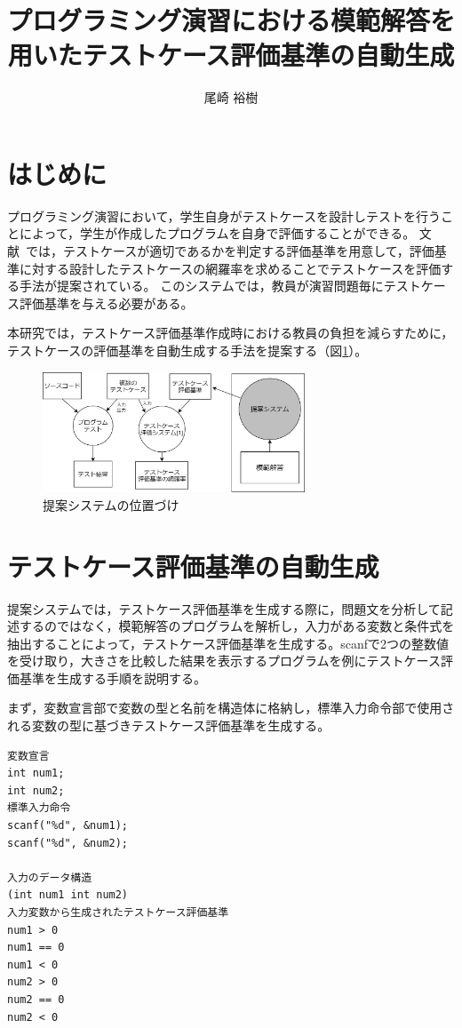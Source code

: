 \documentclass[10pt]{tpu-abst}
\author{尾崎 裕樹}
\title{プログラミング演習における模範解答を\\用いたテストケース評価基準の自動生成}
\begin{document}
%
\maketitle
%
%

\section{ はじめに}
%
プログラミング演習において，学生自身がテストケースを設計しテストを行うことによって，学生が作成したプログラムを自身で評価することができる。
文献~\cite{a1}では，テストケースが適切であるかを判定する評価基準を用意して，評価基準に対する設計したテストケースの網羅率を求めることでテストケースを評価する手法が提案されている。
このシステムでは，教員が演習問題毎にテストケース評価基準を与える必要がある。

本研究では，テストケース評価基準作成時における教員の負担を減らすために，テストケースの評価基準を自動生成する手法を提案する（図\ref{cap1}）。
\begin{figure}[h]
  \centering
  \includegraphics[width=78mm]{提案システムの位置づけ.png}
  \caption{提案システムの位置づけ}
  \label{cap1}
\end{figure}
%
\section{テストケース評価基準の自動生成}
提案システムでは，テストケース評価基準を生成する際に，問題文を分析して記述するのではなく，模範解答のプログラムを解析し，入力がある変数と条件式を抽出することによって，テストケース評価基準を生成する。scanfで2つの整数値を受け取り，大きさを比較した結果を表示するプログラムを例にテストケース評価基準を生成する手順を説明する。

まず，変数宣言部で変数の型と名前を構造体に格納し，標準入力命令部で使用される変数の型に基づきテストケース評価基準を生成する。
\begin{lstlisting}
変数宣言
int num1;
int num2;
標準入力命令
scanf("%d", &num1);
scanf("%d", &num2);

入力のデータ構造
(int num1 int num2)
入力変数から生成されたテストケース評価基準
num1 > 0
num1 == 0
num1 < 0
num2 > 0
num2 == 0
num2 < 0
\end{lstlisting}
\end{document}
